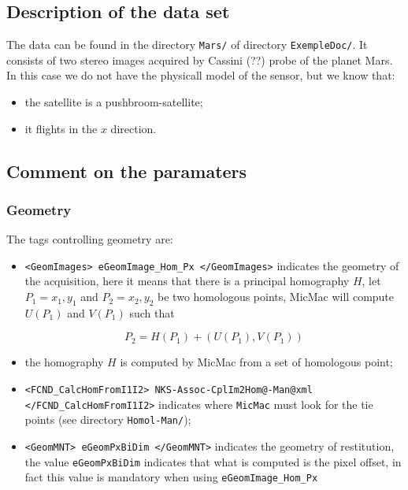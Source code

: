 \subsection{Description of the data set}

The data can be found in the directory {\tt Mars/} of directory {\tt ExempleDoc/}.
It consists of two stereo images acquired by Cassini (??) probe of the planet Mars. In this case
we do not have the physicall model of the sensor, but we know that:

\begin{itemize}
   \item the satellite is a  pushbroom-satellite;
   \item it flights in the $x$ direction.
\end{itemize}

\subsection{Comment on the paramaters}

\subsubsection{Geometry}

The tags controlling geometry are:

\begin{itemize}

   \item   {\tt <GeomImages> eGeomImage\_Hom\_Px </GeomImages>} indicates the geometry of the acquisition,
          here it means that there is a principal homography $H$, let $P_1=x_1,y_1$ and  $P_2=x_2,y_2$ be two
          homologous points, MicMac will compute $U(P_1)$ and $V(P_1)$ such that

\begin{equation}
    P_2 = H(P_1) + (U(P_1),V(P_1))
\end{equation}

   \item  the homography $H$ is computed by MicMac from a set of homologous point;

   \item  {\tt  <FCND\_CalcHomFromI1I2> NKS-Assoc-CplIm2Hom@-Man@xml  </FCND\_CalcHomFromI1I2>}  indicates
          where {\tt MicMac} must look for the tie points (see directory {\tt Homol-Man/});


   \item  {\tt <GeomMNT> eGeomPxBiDim  </GeomMNT>} indicates the geometry of restitution,
          the value {\tt eGeomPxBiDim} indicates that what is computed is the pixel offset, in fact this value
          is mandatory when using {\tt eGeomImage\_Hom\_Px}


\end{itemize}

